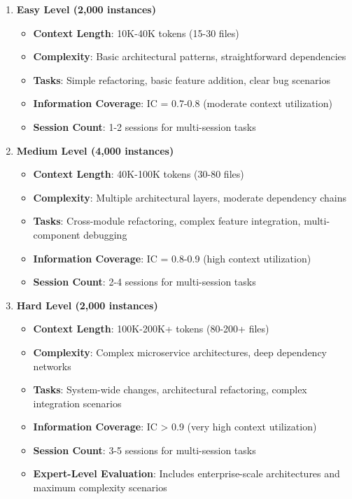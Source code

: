 \documentclass{article}
\begin{document}
\begin{enumerate}
    \item \textbf{Easy Level (2,000 instances)}
    \begin{itemize}
        \item \textbf{Context Length}: 10K-40K tokens (15-30 files)
        \item \textbf{Complexity}: Basic architectural patterns, straightforward dependencies
        \item \textbf{Tasks}: Simple refactoring, basic feature addition, clear bug scenarios
        \item \textbf{Information Coverage}: IC = 0.7-0.8 (moderate context utilization)
        \item \textbf{Session Count}: 1-2 sessions for multi-session tasks
    \end{itemize}
    
    \item \textbf{Medium Level (4,000 instances)}
    \begin{itemize}
        \item \textbf{Context Length}: 40K-100K tokens (30-80 files)
        \item \textbf{Complexity}: Multiple architectural layers, moderate dependency chains
        \item \textbf{Tasks}: Cross-module refactoring, complex feature integration, multi-component debugging
        \item \textbf{Information Coverage}: IC = 0.8-0.9 (high context utilization)
        \item \textbf{Session Count}: 2-4 sessions for multi-session tasks
    \end{itemize}
    
    \item \textbf{Hard Level (2,000 instances)}
    \begin{itemize}
        \item \textbf{Context Length}: 100K-200K+ tokens (80-200+ files)
        \item \textbf{Complexity}: Complex microservice architectures, deep dependency networks
        \item \textbf{Tasks}: System-wide changes, architectural refactoring, complex integration scenarios
        \item \textbf{Information Coverage}: IC > 0.9 (very high context utilization)
        \item \textbf{Session Count}: 3-5 sessions for multi-session tasks
        \item \textbf{Expert-Level Evaluation}: Includes enterprise-scale architectures and maximum complexity scenarios
    \end{itemize}
\end{enumerate}
\end{document}
